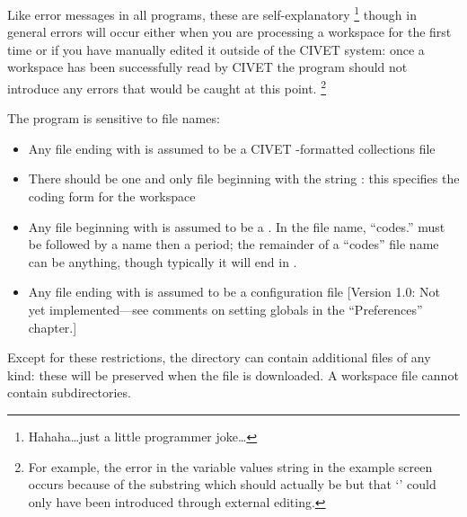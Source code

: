 \documentclass[letterpaper,10pt,english]{sphinxmanual}
\begin{document}
Like error messages in all programs, these are self-explanatory \footnote{
Hahaha…just a little programmer joke…
}
though in general errors will occur either when you are processing a
workspace for the first time or if you have manually edited it outside
of the CIVET system: once a workspace has been successfully read by
CIVET the program should not introduce any errors that would be caught
at this point. \footnote{
For example, the error in the variable values string in the example screen
occurs because of the substring
 which should actually be
 but that ‘\code{=}’ could only have been
introduced through external editing.
}

The program is sensitive to file names:
\begin{itemize}
\item {} 
Any file ending with  is assumed to be a CIVET -formatted
collections file

\item {} 
There should be one and only file beginning with the string
: this specifies the coding form for the workspace

\item {} 
Any file beginning with  is assumed to be a
{\hyperref[workspaces:sec-categories]{\emph{}}}. In the file name,
``codes.'' must be followed by a
 name then a period; the remainder of a ``codes'' file
name can be anything, though typically it will end in .

\item {} 
Any file ending with  is assumed to be a configuration file
{[}Version 1.0: Not yet implemented—see comments on setting globals in
the “Preferences” chapter.{]}

\end{itemize}

Except for these restrictions, the directory can contain additional
files of any kind: these will be preserved when the file is downloaded.
A workspace file cannot contain subdirectories.
\end{document}
